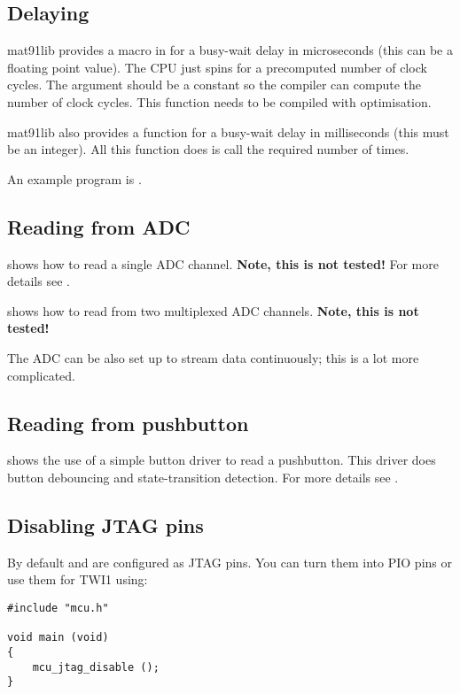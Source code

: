 \subsection{Delaying}

mat91lib provides a macro  in
 for a busy-wait delay in microseconds
(this can be a floating point value).  The CPU just spins for a
precomputed number of clock cycles.  The argument should be a constant
so the compiler can compute the number of clock cycles.  This function
needs to be compiled with optimisation.

mat91lib also provides a function  for a busy-wait
delay in milliseconds (this must be an integer).  All this function
does is call  the required number of times.

An example program is .


\subsection{Reading from ADC}
\label{ADC}

 shows
how to read a single ADC channel.  \textbf{Note, this is not tested!}
For more details see .

 shows
how to read from two multiplexed ADC channels.  \textbf{Note, this is
  not tested!}

The ADC can be also set up to stream data continuously; this is a lot
more complicated.


\subsection{Reading from pushbutton}
\label{pushbutton}

 shows the use of a
simple button driver to read a pushbutton.  This driver does button
debouncing and state-transition detection.  For more details see
.


\subsection{Disabling JTAG pins}
\label{disabling-jtag-pins}

By default  and  are configured as JTAG pins. You can turn
them into PIO pins or use them for TWI1 using:
%
\begin{verbatim}
#include "mcu.h"

void main (void)
{
    mcu_jtag_disable ();
}
\end{verbatim}

